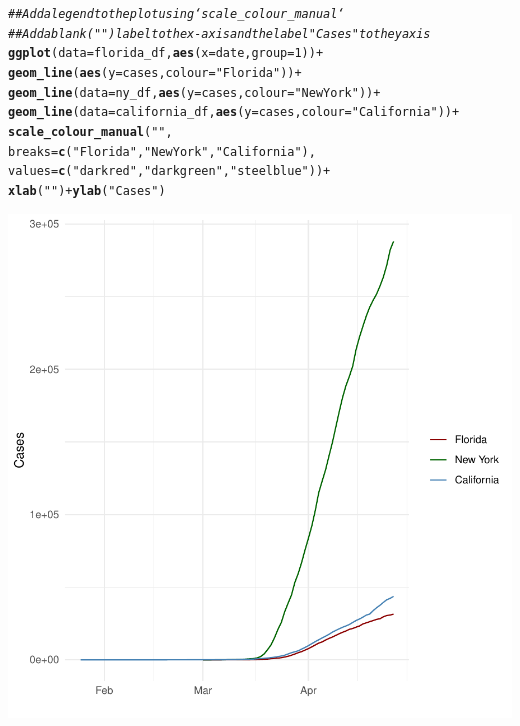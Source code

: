 \documentclass{article}\usepackage[]{graphicx}\usepackage[]{color}
\makeatletter
\newcommand{\hlnum}[1]{\textcolor[rgb]{0.686,0.059,0.569}{#1}}%
\newcommand{\hlstr}[1]{\textcolor[rgb]{0.192,0.494,0.8}{#1}}%
\newcommand{\hlcom}[1]{\textcolor[rgb]{0.678,0.584,0.686}{\textit{#1}}}%
\newcommand{\hlopt}[1]{\textcolor[rgb]{0,0,0}{#1}}%
\newcommand{\hlstd}[1]{\textcolor[rgb]{0.345,0.345,0.345}{#1}}%
\newcommand{\hlkwc}[1]{\textcolor[rgb]{0.333,0.667,0.333}{#1}}%
\newcommand{\hlkwd}[1]{\textcolor[rgb]{0.737,0.353,0.396}{\textbf{#1}}}%
\newenvironment{kframe}{%
 \def\at@end@of@kframe{}%
 \ifinner\ifhmode%
  \def\at@end@of@kframe{\end{minipage}}%
  \begin{minipage}{\columnwidth}%
 \fi\fi%
 \def\FrameCommand##1{\hskip\@totalleftmargin \hskip-\fboxsep
 \colorbox{shadecolor}{##1}\hskip-\fboxsep
     \hskip-\linewidth \hskip-\@totalleftmargin \hskip\columnwidth}%
 \MakeFramed {\advance\hsize-\width
   \@totalleftmargin\z@ \linewidth\hsize
   \@setminipage}}%
 {\par\unskip\endMakeFramed%
 \at@end@of@kframe}
\newenvironment{knitrout}{}{} %
\makeatother
\begin{document}
\begin{knitrout}
{}


\begin{kframe}\begin{alltt}
\hlcom{## Add a legend to the plot using `scale_colour_manual`}
\hlcom{## Add a blank (" ") label to the x-axis and the label "Cases" to the y axis}
\hlkwd{ggplot}\hlstd{(}\hlkwc{data}\hlstd{=florida_df,} \hlkwd{aes}\hlstd{(}\hlkwc{x}\hlstd{=date,} \hlkwc{group}\hlstd{=}\hlnum{1}\hlstd{))} \hlopt{+}
  \hlkwd{geom_line}\hlstd{(}\hlkwd{aes}\hlstd{(}\hlkwc{y} \hlstd{= cases,} \hlkwc{colour} \hlstd{=} \hlstr{"Florida"}\hlstd{))} \hlopt{+}
  \hlkwd{geom_line}\hlstd{(}\hlkwc{data}\hlstd{=ny_df,} \hlkwd{aes}\hlstd{(}\hlkwc{y} \hlstd{= cases,}\hlkwc{colour}\hlstd{=}\hlstr{"New York"}\hlstd{))} \hlopt{+}
  \hlkwd{geom_line}\hlstd{(}\hlkwc{data}\hlstd{=california_df,} \hlkwd{aes}\hlstd{(}\hlkwc{y} \hlstd{= cases,} \hlkwc{colour}\hlstd{=}\hlstr{"California"}\hlstd{))} \hlopt{+}
  \hlkwd{scale_colour_manual}\hlstd{(}\hlstr{""}\hlstd{,}
                      \hlkwc{breaks} \hlstd{=} \hlkwd{c}\hlstd{(}\hlstr{"Florida"}\hlstd{,} \hlstr{"New York"}\hlstd{,} \hlstr{"California"}\hlstd{),}
                      \hlkwc{values} \hlstd{=} \hlkwd{c}\hlstd{(}\hlstr{"darkred"}\hlstd{,} \hlstr{"darkgreen"}\hlstd{,} \hlstr{"steelblue"}\hlstd{))} \hlopt{+}
  \hlkwd{xlab}\hlstd{(}\hlstr{" "}\hlstd{)} \hlopt{+} \hlkwd{ylab}\hlstd{(}\hlstr{"Cases"}\hlstd{)}
\end{alltt}
\end{kframe}

{\centering \includegraphics[width=.6\linewidth]{figure/assignment-04-WilsonStewart-Rnwauto-report-9} 

}



\end{knitrout}
\end{document}
